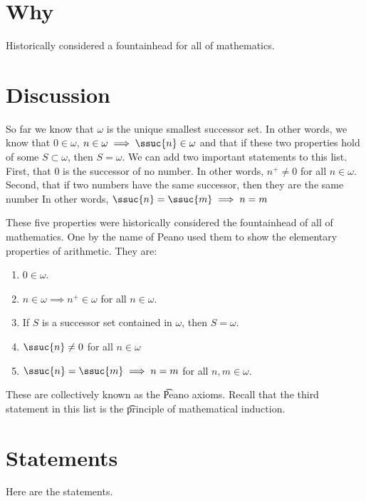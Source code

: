

\section*{Why}

Historically considered a fountainhead for all of mathematics.

\section*{Discussion}

So far we know that $\omega $ is the unique smallest successor set.
In other words, we know that $0 \in \omega $, $n \in \omega \implies \ssuc{n} \in \omega $ and that if these two properties hold of some $S \subset \omega $, then $S = \omega $.
We can add two important statements to this list.
First, that 0 is the successor of no number.
In other words, $n^+ \neq 0$ for all $n \in \omega $.
Second, that if two numbers have the same successor, then they are the same number
In other words, $\ssuc{n} = \ssuc{m} \implies n = m$

These five properties were historically considered the fountainhead of all of mathematics.
One by the name of Peano used them to show the elementary properties of arithmetic.
They are:
    \begin{enumerate}
      \item $0 \in \omega $.
      \item $n \in \omega  \implies n^+ \in \omega $ for all $n \in \omega $.
      \item If $S$ is a successor set contained in $\omega $, then $S = \omega $.
      \item $\ssuc{n} \neq 0$ for all $n \in \omega $
      \item $\ssuc{n} = \ssuc{m} \implies n = m$ for all $n, m \in \omega $.
    \end{enumerate}

These are collectively known as the \t{Peano axioms}.
Recall that the third statement in this list is the \t{principle of mathematical induction}.

\section*{Statements}

Here are the statements.

